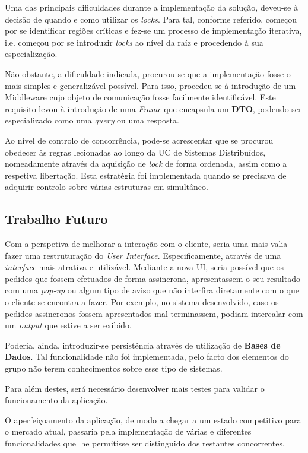 \documentclass[a4paper,11pt]{article}
\begin{document}
Uma das principais dificuldades durante a implementação da solução, deveu-se à decisão de quando 
e como utilizar os \textit{locks}.
Para tal, conforme referido, começou por se identificar regiões críticas e fez-se
um processo de implementação iterativa, i.e. começou por se introduzir \textit{locks}
ao nível da raíz e procedendo à sua especialização.

Não obstante, a dificuldade indicada, procurou-se que a implementação fosse o mais simples
e generalizável possível. Para isso, procedeu-se à introdução de um Middleware cujo objeto
de comunicação fosse facilmente identificável. Este requisito levou à introdução de uma 
\textit{Frame} que encapsula um \textbf{DTO}, podendo ser especializado como uma \textit{query} ou uma resposta.

Ao nível de controlo de concorrência, pode-se acrescentar que se procurou obedecer
às regras lecionadas ao longo da UC de Sistemas Distribuídos, nomeadamente
através da aquisição de \textit{lock} de forma ordenada, assim como a respetiva
libertação. Esta estratégia foi implementada quando se precisava de adquirir controlo
sobre várias estruturas em simultâneo.

\subsection{Trabalho Futuro}

Com a perspetiva de melhorar a interação com o cliente, seria uma mais valia fazer
uma restruturação do \textit{User Interface}.
Especificamente, através de uma \textit{interface} mais atrativa e utilizável.
Mediante a nova UI, seria possível que os pedidos que fossem efetuados de forma assincrona,
apresentassem o seu resultado com uma \textit{pop-up} ou algum tipo de aviso que não interfira
diretamente com o que o cliente se encontra a fazer. Por exemplo, no sistema desenvolvido,
caso os pedidos assincronos fossem apresentados mal terminassem, podiam intercalar
com um \textit{output} que estive a ser exibido.

Poderia, ainda, introduzir-se persistência através de utilização de \textbf{Bases de Dados}.
Tal funcionalidade não foi implementada, pelo facto dos elementos do grupo não terem conhecimentos
sobre esse tipo de sistemas.

Para além destes, será necessário desenvolver mais testes para validar o funcionamento da aplicação.

O aperfeiçoamento da aplicação, de modo a chegar a um estado competitivo para o mercado atual, passaria pela
implementação de várias e diferentes funcionalidades que lhe permitisse ser distinguido dos restantes concorrentes.
\end{document}
